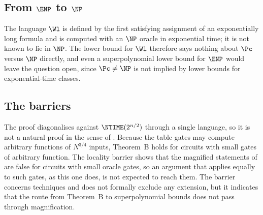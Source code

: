 \subsection{From $\ENP$ to $\NP$}
The language $\Wl$ is defined by the first satisfying assignment of an
exponentially long formula and is computed with an $\NP$ oracle in exponential
time; it is not known to lie in $\NP$. The lower bound for
$\Wl$ therefore says nothing about $\Pc$ versus $\NP$ directly, and even a
superpolynomial lower bound for $\ENP$ would leave the question open, since
$\Pc\ne\NP$ is not implied by lower bounds for exponential-time classes.

\subsection{The barriers}
The proof diagonalises against $\NTIME(2^{n/2})$ through a single language, so
it is not a natural proof in the sense of \cite{RR97}. Because the table gates
may compute arbitrary functions of $N^{3/4}$ inputs, Theorem~B holds for circuits
with small gates of arbitrary function. The locality barrier \cite{CHOPRS22}
shows that the magnified statements of \cite{OS18} are false for circuits with
small oracle gates, so an argument that applies equally to such gates, as this
one does, is not expected to reach them. The barrier concerns techniques and
does not formally exclude any extension, but it indicates that the route from
Theorem~B to superpolynomial bounds does not pass through magnification.
